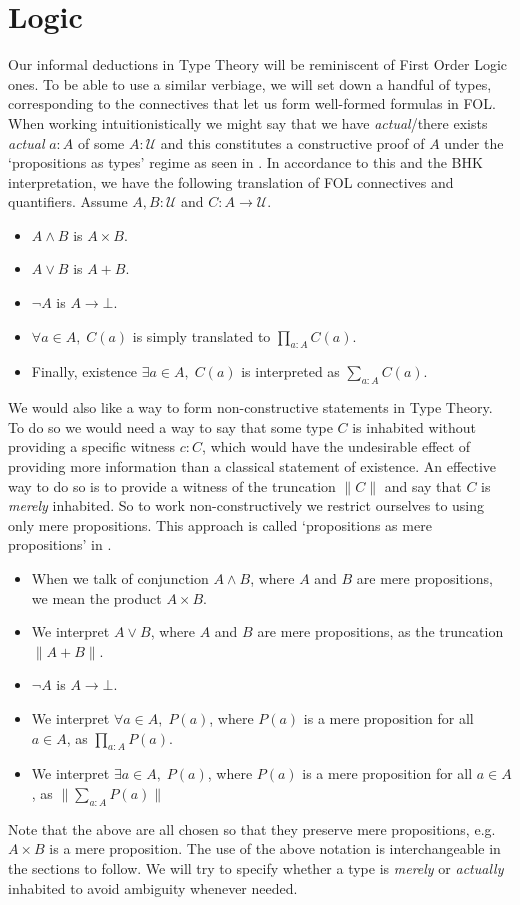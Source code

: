 \documentclass[12pt]{report}
\theoremstyle{definition}
\begin{document}
\section{Logic}
Our informal deductions in Type Theory will be reminiscent of First Order Logic ones. 
To be able to use a similar verbiage, we will set down a handful of types, corresponding to the connectives that let us form well-formed formulas in FOL. 
When working intuitionistically we might say that we have \textit{actual}/there exists \textit{actual} $a : A$ of some $A : \mathcal{U}$ 
and this constitutes a constructive proof of $A$ under the `propositions as types' regime as seen in \cite{hottbook}. 
In accordance to this and the BHK interpretation, we have the following translation of FOL connectives and quantifiers. 
Assume $A, B : \mathcal{U}$ and $C : A \rightarrow \mathcal{U}$.
\begin{itemize}
\item $A \wedge B$ is $A \times B$.
\item $A \vee B$ is $A+ B$.
\item $\neg A$ is $A \rightarrow \bot$. 
\item $\forall a\in A,\; C(a)$ is simply translated to $\prod_{a : A}C(a)$. 
\item Finally, existence $ \exists a \in A,\; C(a)$ is interpreted as $\sum_{a : A}C(a)$.
\end{itemize}

We would also like a way to form non-constructive statements in Type Theory. 
To do so we would need a way to say that some type $C$ is inhabited without providing a specific witness $c : C$, which would have the undesirable effect of providing more information than a classical statement of existence. 
An effective way to do so is to provide a witness of the truncation $\lVert C \rVert$ and say that $C$ is \textit{merely} inhabited. 
So to work non-constructively we restrict ourselves to using only mere propositions. 
This approach is called `propositions as mere propositions' in \cite{hottbook}. 
\begin{itemize}
\item When we talk of conjunction $A \wedge B$, where $A$ and $B$ are mere propositions, we mean the product $A \times B$. 
\item We interpret $A \vee B$, where $A$ and $B$ are mere propositions, as the truncation $\| A + B\|$.
\item $\neg A$ is $A \rightarrow \bot$. 
\item We interpret $\forall a\in A,\; P(a)$, where $P(a)$ is a mere proposition for all $a \in A$, as $\prod_{a : A}P(a)$. 
\item We interpret $ \exists a \in A,\; P(a)$, where $P(a)$ is a mere proposition for all $a \in A$, as $\| \sum_{a : A} P(a) \|$
\end{itemize}
Note that the above are all chosen so that they preserve mere propositions, e.g. $A\times B$ is a mere proposition. 
The use of the above notation is interchangeable in the sections to follow. 
We will try to specify whether a type is \textit{merely} or \textit{actually} inhabited to avoid ambiguity whenever needed. 
\end{document}
